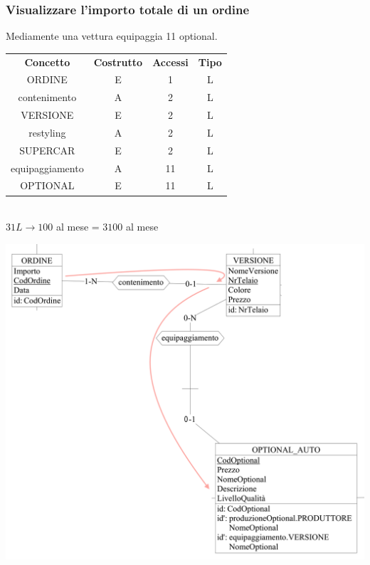 \documentclass[11pt]{article}
\begin{document}
\subsubsection{Visualizzare l'importo totale di un ordine} 

Mediamente una vettura equipaggia 11 optional.

\begin{table}[H]
    \centering
    \begin{tabular}{c c c c}
        \rowcolor{red!20!}
        \textbf{Concetto} & \textbf{Costrutto} & \textbf{Accessi} &
        \textbf{Tipo}\\
        ORDINE & E & 1 & L \\
        contenimento & A & 2 & L \\
        VERSIONE & E & 2 & L \\
        restyling & A & 2 & L \\
        SUPERCAR & E & 2 & L \\
        equipaggiamento & A & 11 & L \\
        OPTIONAL & E & 11 & L \\
    \end{tabular}\\
    \( 31L \rightarrow 100 \) al mese = \( 3100 \) al mese
\end{table}

\begin{center}
    \includegraphics[width=\linewidth]{images/navigationSchemes/calcolaOrdine.png}
\end{center}
\end{document}
